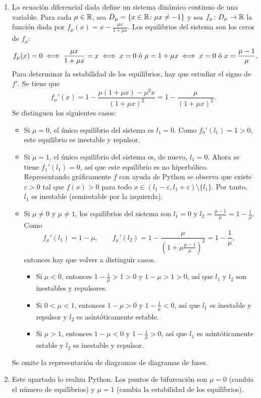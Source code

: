 \documentclass[11pt]{report}
\begin{document}
\begin{solution}
    \hfill
    \begin{enumerate}
        \item La ecuación diferencial dada define un sistema dinámico continuo de una variable. Para cada $\mu\in\mathbb R$, sea $D_\mu = \{x \in \mathbb R \colon \mu x \neq -1\}$ y sea $f_\mu \colon D_\mu \to \mathbb R$ la función dada por $f_\mu(x) = x-\frac{\mu x}{1+\mu x}$. Los equilibrios del sistema son los ceros de $f_\mu$:
        \begin{align*}
            f_\mu(x) = 0 &\iff \frac{\mu x}{1+\mu x} = x \iff x = 0 \textup{ ó } \mu = 1+\mu x \iff x = 0 \textup{ ó } x = \frac{\mu-1}{\mu}.
        \end{align*}
        Para determinar la estabilidad de los equilibrios, hay que estudiar el signo de $f'$. Se tiene que
        \[f_\mu'(x) = 1-\frac{\mu(1+\mu x) - \mu^2x}{(1+\mu x)^2} =  1-\frac{\mu}{(1+\mu x)^2}.\]
        Se distinguen los siguientes casos:
        \begin{itemize}
            \item Si $\mu = 0$, el único equilibrio del sistema es $l_1 = 0$. Como $f_0'(l_1) = 1 > 0$, este equilibrio es inestable y repulsor.
            \item Si $\mu = 1$, el único equilibrio del sistema es, de nuevo, $l_1 = 0$. Ahora se tiene $f_1'(l_1) = 0$, así que este equilibrio es no hiperbólico. Representando gráficamente $f$ con ayuda de Python se observa que existe $\varepsilon > 0$ tal que $f(x) > 0$ para todo $x \in (l_1-\varepsilon,l_1+\varepsilon) \setminus \{l_1\}$. Por tanto, $l_1$ es inestable (semiestable por la izquierda).
            \item Si $\mu \neq 0$ y $\mu \neq 1$, los equilibrios del sistema son $l_1 = 0$ y $l_2 = \frac{\mu-1}{\mu} = 1-\frac{1}{\mu}$. Como
            \[f_\mu'(l_1) = 1-\mu, \qquad f_\mu'(l_2) = 1-\frac{\mu}{(1+\mu\frac{\mu-1}{\mu})^2} = 1-\frac{1}{\mu},\] 
            entonces hay que volver a distinguir casos.
            \begin{itemize}
                \item Si $\mu < 0$, entonces $1-\frac{1}{\mu} > 1 > 0$ y $1-\mu > 1 > 0$, así que $l_1$ y $l_2$ son inestables y repulsores.
                \item Si $0 < \mu < 1$, entonces $1-\mu > 0$ y $1-\frac{1}{\mu} < 0$, así que $l_1$ es inestable y repulsor y $l_2$ es asintóticamente estable.
                \item Si $\mu > 1$, entonces $1-\mu < 0$ y $1-\frac{1}{\mu} > 0$, así que $l_1$ es asintóticamente estable y $l_2$ es inestable y repulsor.
            \end{itemize}
        \end{itemize}
        Se omite la representación de diagramas de diagramas de fases.
        \item Este apartado lo realiza Python. Los puntos de bifurcación son $\mu = 0$ (cambia el número de equilibrios) y $\mu = 1$ (cambia la estabilidad de los equilibrios).
    \end{enumerate}
\end{solution}
\end{document}
